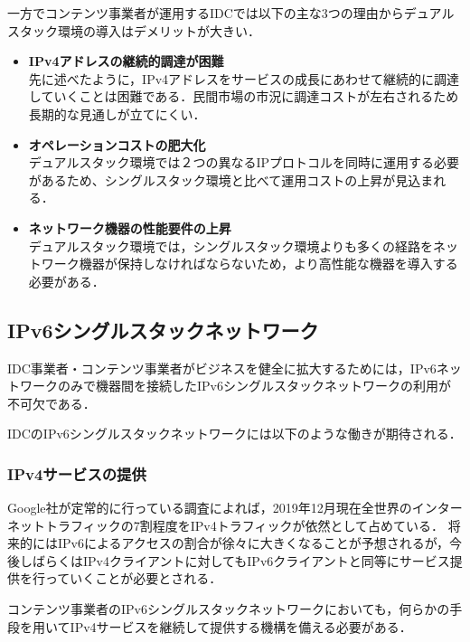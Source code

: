 一方でコンテンツ事業者が運用するIDCでは以下の主な3つの理由からデュアルスタック環境の導入はデメリットが大きい．

\begin{itemize}
    \item \textbf{IPv4アドレスの継続的調達が困難} \\
    先に述べたように，IPv4アドレスをサービスの成長にあわせて継続的に調達していくことは困難である．民間市場の市況に調達コストが左右されるため長期的な見通しが立てにくい．
    \item \textbf{オペレーションコストの肥大化}\\
デュアルスタック環境では２つの異なるIPプロトコルを同時に運用する必要があるため、シングルスタック環境と比べて運用コストの上昇が見込まれる\cite{北口善明2017クライアント}．
    \item \textbf{ネットワーク機器の性能要件の上昇}\\
デュアルスタック環境では，シングルスタック環境よりも多くの経路をネットワーク機器が保持しなければならないため，より高性能な機器を導入する必要がある．
\end{itemize}



\subsection{IPv6シングルスタックネットワーク}
\label{introduction:background:IPv6-single-stack-network}
IDC事業者・コンテンツ事業者がビジネスを健全に拡大するためには，IPv6ネットワークのみで機器間を接続したIPv6シングルスタックネットワークの利用が不可欠である．

IDCのIPv6シングルスタックネットワークには以下のような働きが期待される．


\subsubsection{IPv4サービスの提供}
\label{introduction:background:IPv6-single-stack-network:ipv4-service}
Google社が定常的に行っている調査\cite{Google_IPv6_statistics}によれば，2019年12月現在全世界のインターネットトラフィックの7割程度をIPv4トラフィックが依然として占めている．
将来的にはIPv6によるアクセスの割合が徐々に大きくなることが予想されるが，今後しばらくはIPv4クライアントに対してもIPv6クライアントと同等にサービス提供を行っていくことが必要とされる．

コンテンツ事業者のIPv6シングルスタックネットワークにおいても，何らかの手段を用いてIPv4サービスを継続して提供する機構を備える必要がある．

